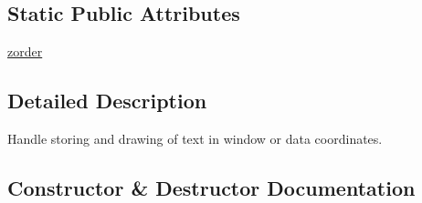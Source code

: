 \subsection*{Static Public Attributes}
\begin{DoxyCompactItemize}
\item 
\hyperlink{classmatplotlib_1_1text_1_1Text_a3ec84cd269701cb109b4ec2485f46f30}{zorder}
\end{DoxyCompactItemize}


\subsection{Detailed Description}
\begin{DoxyVerb}Handle storing and drawing of text in window or data coordinates.\end{DoxyVerb}
 

\subsection{Constructor \& Destructor Documentation}
\mbox{\label{classmatplotlib_1_1text_1_1Text_ab689426358cf8b6e12de4d15238b4925}} 
